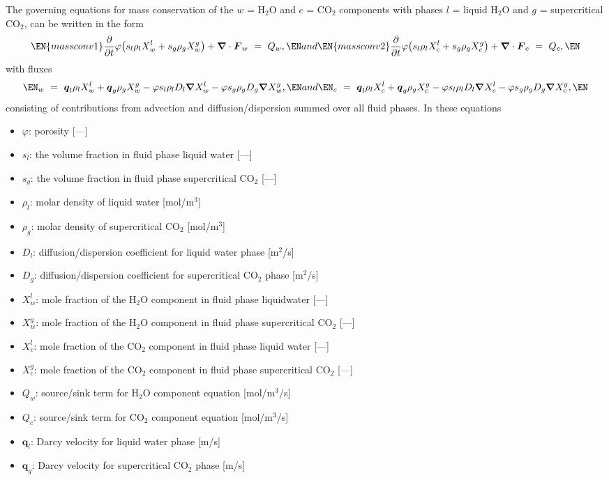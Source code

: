 \documentclass[12pt]{article}
\def\EQ#1\EN{\begin{equation}#1\end{equation}}
\newcommand{\eq}{\ =\ }
\newcommand{\p}{{\partial}}
\newcommand{\bnabla}{\boldsymbol{\nabla}}
\newcommand{\bF}{\boldsymbol{F}}
\newcommand{\bq}{\boldsymbol{q}}
\begin{document}
The governing equations for mass conservation of the $w$ = H$_2$O and $c$ = CO$_2$ components with phases $l$ = liquid H$_2$O and $g$ = supercritical CO$_2$, can be written in the form
\begin{subequations}
\EQ\label{massconv1}
\frac{\p}{\p t} \varphi \big( s_l \rho_l X_w^l + s_g \rho_g X_w^g\big) + \bnabla\cdot\bF_w \eq Q_w,
\EN
and
\EQ\label{massconv2}
\frac{\p}{\p t} \varphi \big( s_l \rho_l X_c^l + s_g \rho_g X_c^g\big) + \bnabla\cdot\bF_c \eq Q_c,
\EN
\end{subequations}
with fluxes
\begin{subequations}
\EQ
\bF_w \eq \bq_l \rho_l X_w^l+ \bq_g \rho_g X_w^g -\varphi s_l \rho_l D_l \bnabla X_w^l-\varphi s_g \rho_g D_g \bnabla X_w^g,
\EN
and 
\EQ
\bF_c \eq \bq_l \rho_l X_c^l+ \bq_g \rho_g X_c^g -\varphi s_l \rho_l D_l \bnabla X_c^l-\varphi s_g \rho_g D_g \bnabla X_c^g,
\EN
\end{subequations}
consisting of contributions from advection and diffusion/dispersion summed over all fluid phases.
In these equations 
\begin{itemize}
\item $\varphi$: porosity [---]
\item $s_l$: the volume fraction in fluid phase liquid water [---]
\item $s_g$: the volume fraction in fluid phase supercritical CO$_2$ [---]
\item $\rho_l$: molar density of liquid water [mol/m$^3$]
\item $\rho_g$: molar density of supercritical CO$_2$ [mol/m$^3$]
\item $D_l$: diffusion/dispersion coefficient for liquid water phase [m$^2$/s]
\item $D_g$: diffusion/dispersion coefficient for supercritical CO$_2$ phase [m$^2$/s]
\item $X_w^l$: mole fraction of the H$_2$O component in fluid phase liquidwater [---] 
\item $X_w^g$: mole fraction of the H$_2$O component in fluid phase supercritical CO$_2$ [---]
\item $X_c^l$: mole fraction of the CO$_2$ component in fluid phase liquid water [---]
\item $X_c^g$: mole fraction of the CO$_2$ component in fluid phase supercritical CO$_2$ [---]
\item $Q_w$: source/sink term for H$_2$O component equation [mol/m$^3$/s]
\item $Q_c$: source/sink term for  CO$_2$ component equation [mol/m$^3$/s]
\item $\bq_l$: Darcy velocity for liquid water phase [m/s]
\item $\bq_g$: Darcy velocity for supercritical CO$_2$ phase [m/s]
\end{itemize}
\end{document}
